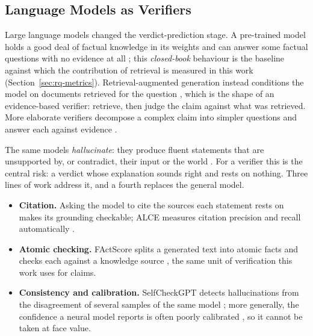 
\subsection{Language Models as Verifiers}

Large language models changed the verdict-prediction stage. A
pre-trained model holds a good deal of factual knowledge in its weights
and can answer some factual questions with no evidence at all
\cite{petroni2019lama}; this \emph{closed-book} behaviour is the
baseline against which the contribution of retrieval is measured in
this work (Section~\ref{sec:rq-metrics}). Retrieval-augmented
generation instead conditions the model on documents retrieved for the
question \cite{lewis2020rag}, which is the shape of an evidence-based
verifier: retrieve, then judge the claim against what was retrieved.
More elaborate verifiers decompose a complex claim into simpler
questions and answer each against evidence \cite{pan2023programfc}.

The same models \emph{hallucinate}: they produce fluent statements that
are unsupported by, or contradict, their input or the world
\cite{ji2023hallucination}. For a verifier this is the central risk:
a verdict whose explanation sounds right and rests on nothing. Three
lines of work address it, and a fourth replaces the general model.

\begin{itemize}
    \item \textbf{Citation.} Asking the model to cite the sources each
    statement rests on makes its grounding checkable; ALCE measures
    citation precision and recall automatically
    \cite{gao2023alce}.
    \item \textbf{Atomic checking.} FActScore splits a generated text
    into atomic facts and checks each against a knowledge source
    \cite{min2023factscore}, the same unit of verification this work
    uses for claims.
    \item \textbf{Consistency and calibration.} SelfCheckGPT detects
    hallucinations from the disagreement of several samples of the same
    model \cite{manakul2023selfcheckgpt}; more generally, the confidence
    a neural model reports is often poorly calibrated
    \cite{guo2017calibration}, so it cannot be taken at face value.
\end{itemize}

